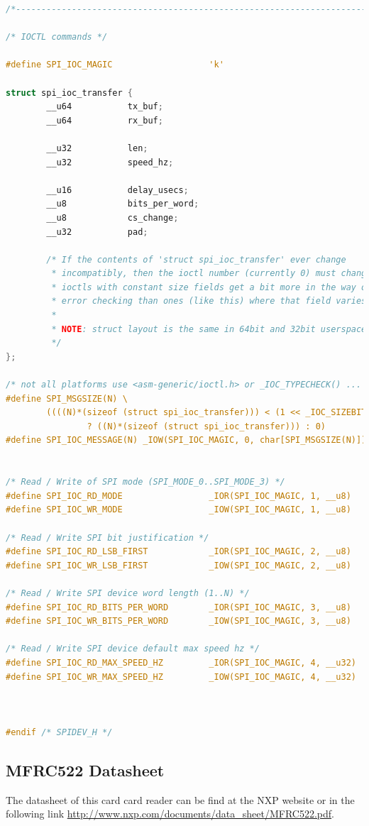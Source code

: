 \begin{lstlisting}[language=C, caption={linux/spi/spidev.h}]
/*---------------------------------------------------------------------------*/

/* IOCTL commands */

#define SPI_IOC_MAGIC                   'k'

struct spi_ioc_transfer {
        __u64           tx_buf;
        __u64           rx_buf;

        __u32           len;
        __u32           speed_hz;

        __u16           delay_usecs;
        __u8            bits_per_word;
        __u8            cs_change;
        __u32           pad;

        /* If the contents of 'struct spi_ioc_transfer' ever change
         * incompatibly, then the ioctl number (currently 0) must change;
         * ioctls with constant size fields get a bit more in the way of
         * error checking than ones (like this) where that field varies.
         *
         * NOTE: struct layout is the same in 64bit and 32bit userspace.
         */
};

/* not all platforms use <asm-generic/ioctl.h> or _IOC_TYPECHECK() ... */
#define SPI_MSGSIZE(N) \
        ((((N)*(sizeof (struct spi_ioc_transfer))) < (1 << _IOC_SIZEBITS)) \
                ? ((N)*(sizeof (struct spi_ioc_transfer))) : 0)
#define SPI_IOC_MESSAGE(N) _IOW(SPI_IOC_MAGIC, 0, char[SPI_MSGSIZE(N)])


/* Read / Write of SPI mode (SPI_MODE_0..SPI_MODE_3) */
#define SPI_IOC_RD_MODE                 _IOR(SPI_IOC_MAGIC, 1, __u8)
#define SPI_IOC_WR_MODE                 _IOW(SPI_IOC_MAGIC, 1, __u8)

/* Read / Write SPI bit justification */
#define SPI_IOC_RD_LSB_FIRST            _IOR(SPI_IOC_MAGIC, 2, __u8)
#define SPI_IOC_WR_LSB_FIRST            _IOW(SPI_IOC_MAGIC, 2, __u8)

/* Read / Write SPI device word length (1..N) */
#define SPI_IOC_RD_BITS_PER_WORD        _IOR(SPI_IOC_MAGIC, 3, __u8)
#define SPI_IOC_WR_BITS_PER_WORD        _IOW(SPI_IOC_MAGIC, 3, __u8)

/* Read / Write SPI device default max speed hz */
#define SPI_IOC_RD_MAX_SPEED_HZ         _IOR(SPI_IOC_MAGIC, 4, __u32)
#define SPI_IOC_WR_MAX_SPEED_HZ         _IOW(SPI_IOC_MAGIC, 4, __u32)



#endif /* SPIDEV_H */
\end{lstlisting}

\subsection{MFRC522 Datasheet}\label{SS:Libs-MFRC522-Datasheet}
The datasheet of this card card reader can be find at the NXP website or in the following link \url{http://www.nxp.com/documents/data_sheet/MFRC522.pdf}.
\\
